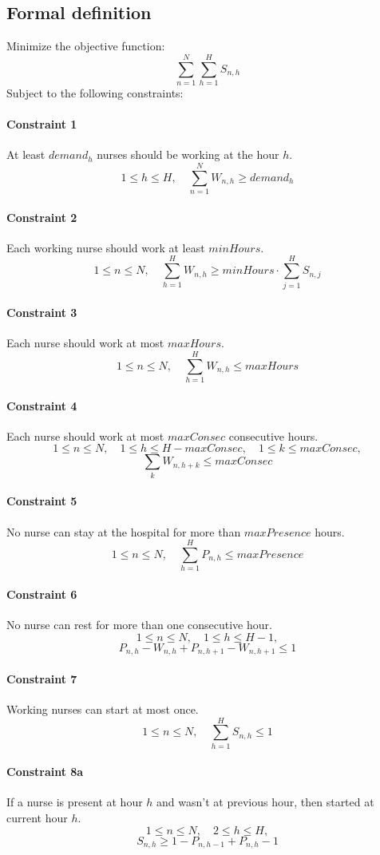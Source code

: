 \documentclass[12pt,a4paper]{article}
\begin{document}
\subsection{Formal definition}

Minimize the objective function:
%
$$\sum_{n=1}^N \sum_{h=1}^H S_{n,h} $$
%
Subject to the following constraints:
%
\paragraph{Constraint 1} At least $demand_h$ nurses should be working
at the hour $h$.
$$ 1 \le h \le H,\quad \sum_{n=1}^N W_{n,h} \ge demand_h$$
%
\paragraph{Constraint 2} Each working nurse should work at least $minHours$.
$$ 1 \le n \le N,\quad \sum_{h = 1}^H W_{n,h} \ge
	minHours \cdot \sum_{j=1}^H S_{n,j} $$
%
\paragraph{Constraint 3} Each nurse should work at most $maxHours$.
$$ 1 \le n \le N,\quad \sum_{h = 1}^H W_{n,h} \le maxHours $$
%
\paragraph{Constraint 4} Each nurse should work at most $maxConsec$ consecutive
hours.
$$ 1 \le n \le N,\quad 1 \le h \le H - maxConsec, \quad 1 \le k \le maxConsec,$$
$$\sum_k W_{n, h+k} \le maxConsec
$$
%
\paragraph{Constraint 5} No nurse can stay at the hospital for more than
$maxPresence$ hours.
$$ 1 \le n \le N, \quad \sum_{h = 1}^H P_{n,h} \le maxPresence $$
%
\paragraph{Constraint 6} No nurse can rest for more than one consecutive hour.
$$ 1 \le n \le N,\quad  1 \le h \le H-1,$$
$$ P_{n,h} - W_{n, h} + P_{n,h+1} - W_{n, h+1} \le 1 $$
%
\paragraph{Constraint 7} Working nurses can start at most once.
$$ 1 \le n \le N,\quad \sum_{h = 1}^H S_{n,h} \le 1 $$
%
\paragraph{Constraint 8a} If a nurse is present at hour $h$ and wasn't at
previous hour, then started at current hour $h$.
$$ 1 \le n \le N, \quad 2 \le h \le H,$$
$$ S_{n,h} \ge 1 - P_{n, h-1} + P_{n, h} - 1 $$
%
\end{document}
